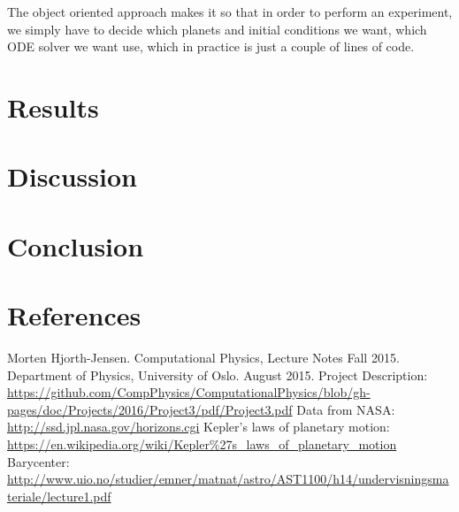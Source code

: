 \documentclass[norsk,a4paper,12pt]{article}
\begin{document}
{The object oriented approach makes it so that in order to perform an experiment, we simply have to decide which planets and initial conditions we want, which ODE solver we want use, which in practice is just a couple of lines of code.

\section{Results}
\section{Discussion}
\section{Conclusion}
\section{References}
\begingroup
\renewcommand{\section}[2]{}
\begin{thebibliography}{}
  Morten Hjorth-Jensen.
  Computational Physics, Lecture Notes Fall 2015.
  Department of Physics, University of Oslo.
  August 2015.
  Project Description:\newline
  \url{https://github.com/CompPhysics/ComputationalPhysics/blob/gh-pages/doc/Projects/2016/Project3/pdf/Project3.pdf}
  Data from NASA:\newline
  \url{http://ssd.jpl.nasa.gov/horizons.cgi}
  Kepler's laws of planetary motion:\newline
  \url{https://en.wikipedia.org/wiki/Kepler\%27s_laws_of_planetary_motion}
  Barycenter:\newline
  \url{http://www.uio.no/studier/emner/matnat/astro/AST1100/h14/undervisningsmateriale/lecture1.pdf}
\end{thebibliography}
\endgroup
\end{document}
